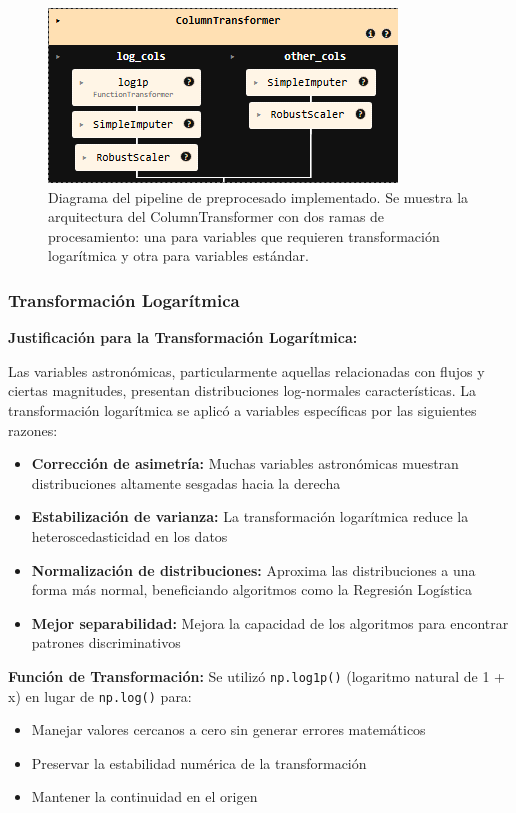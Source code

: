 \documentclass{article}
\begin{document}
\begin{figure}[H]
    \centering
    \includegraphics[width=0.6\linewidth]{preprocesado_pipeline.png}
    \caption{Diagrama del pipeline de preprocesado implementado. Se muestra la arquitectura del ColumnTransformer con dos ramas de procesamiento: una para variables que requieren transformación logarítmica y otra para variables estándar.}
    \label{fig:pipeline_preprocesado}
\end{figure}

\subsubsection{Transformación Logarítmica}

\textbf{Justificación para la Transformación Logarítmica:}

Las variables astronómicas, particularmente aquellas relacionadas con flujos y ciertas magnitudes, presentan distribuciones log-normales características. La transformación logarítmica se aplicó a variables específicas por las siguientes razones:

\begin{itemize}
    \item \textbf{Corrección de asimetría:} Muchas variables astronómicas muestran distribuciones altamente sesgadas hacia la derecha
    \item \textbf{Estabilización de varianza:} La transformación logarítmica reduce la heteroscedasticidad en los datos
    \item \textbf{Normalización de distribuciones:} Aproxima las distribuciones a una forma más normal, beneficiando algoritmos como la Regresión Logística
    \item \textbf{Mejor separabilidad:} Mejora la capacidad de los algoritmos para encontrar patrones discriminativos
\end{itemize}

\textbf{Función de Transformación:}
Se utilizó \texttt{np.log1p()} (logaritmo natural de 1 + x) en lugar de \texttt{np.log()} para:
\begin{itemize}
    \item Manejar valores cercanos a cero sin generar errores matemáticos
    \item Preservar la estabilidad numérica de la transformación
    \item Mantener la continuidad en el origen
\end{itemize}
\end{document}
